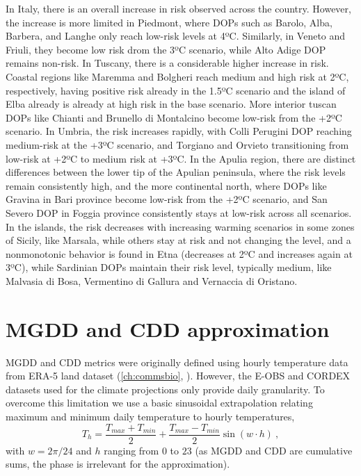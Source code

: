 In Italy, there is an overall increase in risk observed across the country.
However, the increase is more limited in Piedmont, where DOPs such as Barolo,
Alba, Barbera, and Langhe only reach low-risk levels at 4ºC. Similarly, in
Veneto and Friuli, they become low risk drom the 3ºC scenario, while Alto Adige
DOP remains non-risk. In Tuscany, there is a considerable higher increase in
risk. Coastal regions like Maremma and Bolgheri reach medium and high risk at
2ºC, respectively, having positive risk already in the 1.5ºC scenario and the
island of Elba already is already at high risk in the base scenario. More
interior tuscan DOPs like Chianti and Brunello di Montalcino become low-risk
from the +2ºC scenario. In Umbria, the risk increases rapidly, with Colli
Perugini DOP reaching medium-risk at the +3ºC scenario, and Torgiano and
Orvieto transitioning from low-risk at +2ºC to medium risk at +3ºC. In the
Apulia region, there are distinct differences between the lower tip of the
Apulian peninsula, where the risk levels remain consistently high, and the more
continental north, where DOPs like Gravina in Bari province become low-risk
from the +2ºC scenario, and San Severo DOP in Foggia province consistently
stays at low-risk across all scenarios. In the islands, the risk decreases with
increasing warming scenarios in some zones of Sicily, like Marsala, while
others stay at risk and not changing the level, and a nonmonotonic behavior is
found in Etna (decreases at 2ºC and increases again at 3ºC), while Sardinian
DOPs maintain their risk level, typically medium, like Malvasia di Bosa,
Vermentino di Gallura and Vernaccia di Oristano.

\section{MGDD and CDD approximation}

MGDD and CDD metrics were originally defined using hourly temperature data from
ERA-5 land dataset
(\cref{ch:commsbio}, \cite{GimenezRomero2022_CommsBio}). However, the E-OBS and
CORDEX datasets used for the climate projections only provide daily
granularity.
To overcome this limitation we use a basic sinusoidal
extrapolation relating maximum and minimum daily temperature to hourly
temperatures,
\begin{equation}\label{eq:approx}
    T_h=\frac{T_{max}+T_{min}}{2} + \frac{T_{max}-T_{min}}{2}\sin(w\cdot h)
    \ ,
\end{equation}
with $w=2\pi/24$ and $h$ ranging from $0$ to $23$ (as MGDD and CDD are
cumulative sums, the phase is irrelevant for the approximation).

